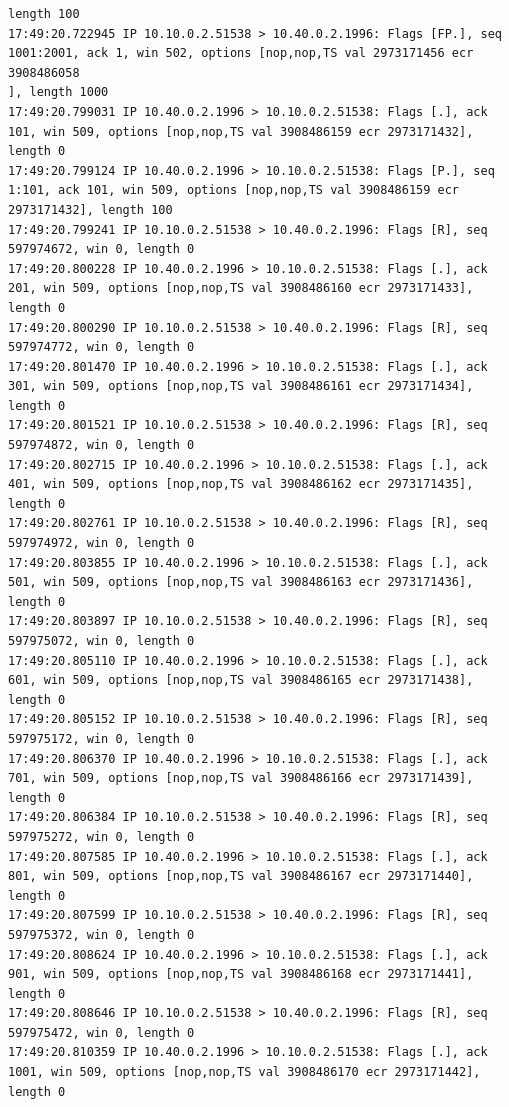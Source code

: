 \documentclass[a4paper,12pt]{article}
\begin{document}
\begin{Verbatim}
length 100
17:49:20.722945 IP 10.10.0.2.51538 > 10.40.0.2.1996: Flags [FP.], seq 1001:2001, ack 1, win 502, options [nop,nop,TS val 2973171456 ecr 3908486058
], length 1000
17:49:20.799031 IP 10.40.0.2.1996 > 10.10.0.2.51538: Flags [.], ack 101, win 509, options [nop,nop,TS val 3908486159 ecr 2973171432], length 0
17:49:20.799124 IP 10.40.0.2.1996 > 10.10.0.2.51538: Flags [P.], seq 1:101, ack 101, win 509, options [nop,nop,TS val 3908486159 ecr 2973171432], length 100
17:49:20.799241 IP 10.10.0.2.51538 > 10.40.0.2.1996: Flags [R], seq 597974672, win 0, length 0
17:49:20.800228 IP 10.40.0.2.1996 > 10.10.0.2.51538: Flags [.], ack 201, win 509, options [nop,nop,TS val 3908486160 ecr 2973171433], length 0
17:49:20.800290 IP 10.10.0.2.51538 > 10.40.0.2.1996: Flags [R], seq 597974772, win 0, length 0
17:49:20.801470 IP 10.40.0.2.1996 > 10.10.0.2.51538: Flags [.], ack 301, win 509, options [nop,nop,TS val 3908486161 ecr 2973171434], length 0
17:49:20.801521 IP 10.10.0.2.51538 > 10.40.0.2.1996: Flags [R], seq 597974872, win 0, length 0
17:49:20.802715 IP 10.40.0.2.1996 > 10.10.0.2.51538: Flags [.], ack 401, win 509, options [nop,nop,TS val 3908486162 ecr 2973171435], length 0
17:49:20.802761 IP 10.10.0.2.51538 > 10.40.0.2.1996: Flags [R], seq 597974972, win 0, length 0
17:49:20.803855 IP 10.40.0.2.1996 > 10.10.0.2.51538: Flags [.], ack 501, win 509, options [nop,nop,TS val 3908486163 ecr 2973171436], length 0
17:49:20.803897 IP 10.10.0.2.51538 > 10.40.0.2.1996: Flags [R], seq 597975072, win 0, length 0
17:49:20.805110 IP 10.40.0.2.1996 > 10.10.0.2.51538: Flags [.], ack 601, win 509, options [nop,nop,TS val 3908486165 ecr 2973171438], length 0
17:49:20.805152 IP 10.10.0.2.51538 > 10.40.0.2.1996: Flags [R], seq 597975172, win 0, length 0
17:49:20.806370 IP 10.40.0.2.1996 > 10.10.0.2.51538: Flags [.], ack 701, win 509, options [nop,nop,TS val 3908486166 ecr 2973171439], length 0
17:49:20.806384 IP 10.10.0.2.51538 > 10.40.0.2.1996: Flags [R], seq 597975272, win 0, length 0
17:49:20.807585 IP 10.40.0.2.1996 > 10.10.0.2.51538: Flags [.], ack 801, win 509, options [nop,nop,TS val 3908486167 ecr 2973171440], length 0
17:49:20.807599 IP 10.10.0.2.51538 > 10.40.0.2.1996: Flags [R], seq 597975372, win 0, length 0
17:49:20.808624 IP 10.40.0.2.1996 > 10.10.0.2.51538: Flags [.], ack 901, win 509, options [nop,nop,TS val 3908486168 ecr 2973171441], length 0
17:49:20.808646 IP 10.10.0.2.51538 > 10.40.0.2.1996: Flags [R], seq 597975472, win 0, length 0
17:49:20.810359 IP 10.40.0.2.1996 > 10.10.0.2.51538: Flags [.], ack 1001, win 509, options [nop,nop,TS val 3908486170 ecr 2973171442], length 0

\end{Verbatim}
\end{document}
